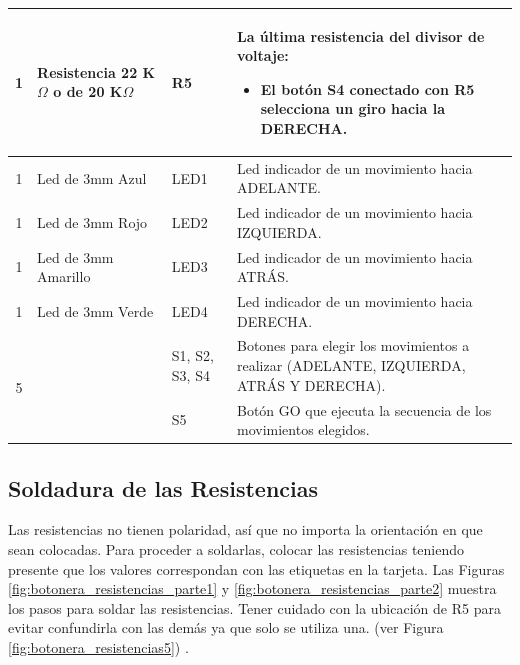 \documentclass{article}
\begin{document}
\begin{longtable}{|c|>{\raggedright}m{}|>{\centering}m{}|m{}|}
        1 & Resistencia 22 K$\Omega$ o de 20 K$\Omega$ & R5 & La última resistencia  del divisor de voltaje: 
        \begin{itemize}
            \item El botón S4 conectado con R5 selecciona un giro hacia la DERECHA.
        \end{itemize}\\ \hline
        1 & Led de 3mm Azul & LED1 & Led indicador de un movimiento hacia ADELANTE. \\ \hline
        1 & Led de 3mm Rojo & LED2 & Led indicador de un movimiento hacia IZQUIERDA. \\ \hline
        1 & Led de 3mm Amarillo & LED3 & Led indicador de un movimiento hacia ATRÁS. \\ \hline
        1 & Led de 3mm Verde & LED4 & Led indicador de un movimiento hacia DERECHA. \\ \hline
        \multirow{2}{*}{5}
        & \multirow{2}{*}{Pulsadores de 12mm} & S1, S2, S3, S4 & Botones para elegir los movimientos a realizar (ADELANTE, IZQUIERDA, ATRÁS Y DERECHA).\\ \cline{3-4}
        & & S5 & Botón GO que ejecuta la secuencia de los movimientos elegidos.\\ \hline 
\end{longtable}

\subsection{Soldadura de las Resistencias}
Las resistencias no tienen polaridad, así que no importa la orientación en que sean colocadas. Para proceder a soldarlas, colocar las resistencias teniendo presente que los valores correspondan con las etiquetas en la tarjeta. Las Figuras \ref{fig:botonera_resistencias_parte1} y \ref{fig:botonera_resistencias_parte2} muestra los pasos para soldar las resistencias. Tener cuidado con la ubicación de R5 para evitar confundirla con las demás ya que solo se utiliza una. (ver Figura \ref{fig:botonera_resistencias5}) .
\end{document}

